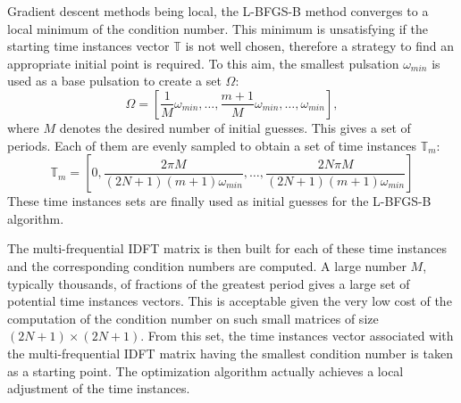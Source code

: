 Gradient descent methods being local, the L-BFGS-B method converges to a local
minimum of the condition number. This minimum is unsatisfying if the
starting time instances vector $\mathbb{T}$ is not well chosen, therefore a strategy
to find an appropriate initial point is required. To this aim, the smallest
pulsation $\omega_{min}$ is used as a base pulsation to create a set $\Omega$:
\begin{equation}
    \Omega = [\frac{1}{M} \omega_{min}, \ldots, \frac{m+1}{M} \omega_{min}, \ldots, \omega_{min}],
    \label{eq:slitted_period}
\end{equation}
where $M$ denotes the desired number of initial guesses.
This gives a set of periods. Each of them are evenly sampled to obtain a
set of time instances $\mathbb{T}_m$:
\begin{equation}
    \mathbb{T}_m = \left[ 0, \frac{2 \pi M}{ (2N + 1) (m+1) \omega_{min}}, \ldots, 
                             \frac{2N \pi M}{ (2N + 1) (m+1) \omega_{min}} \right]
    \label{eq:set_of_tlv}
\end{equation}
These time instances sets are finally used as initial guesses for the
L-BFGS-B algorithm.

The multi-frequential IDFT matrix is then built for
each of these time instances and the corresponding condition numbers are
computed. A large number $M$, typically thousands, of fractions of the
greatest period gives a large set of potential time instances vectors.
This is acceptable given the very low cost of the computation of the
condition number on such small matrices of size $(2N + 1) \times
(2N+1)$.  From this set, the time instances vector associated with the
multi-frequential IDFT matrix having the smallest condition number is
taken as a starting point.  The optimization algorithm actually achieves
a local adjustment of the time instances.

